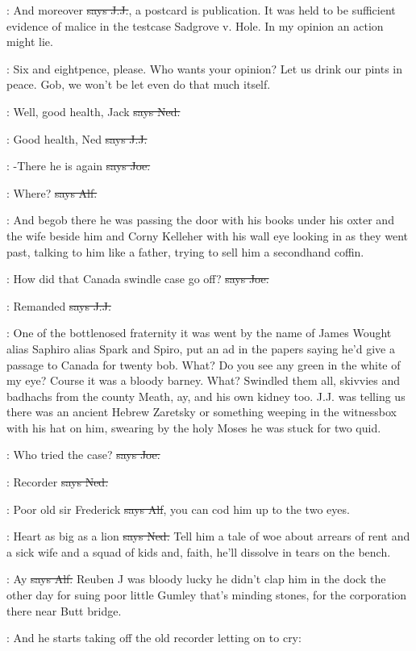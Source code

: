 \jjom:
And moreover
\sout{says J.J.},
a postcard is publication.
It was held to be
sufficient evidence of malice in the testcase Sadgrove v.
Hole.
In my
opinion an action might lie.

\Nq:
Six and eightpence,
please.
Who wants your opinion?
Let us drink
our pints in peace.
Gob,
we won't be let even do that much itself.

\lambert:
Well,
good health,
Jack
\sout{says Ned.}

\jjom:
Good health,
Ned
\sout{says J.J.}

\joe:
-There he is again
\sout{says Joe.}

\bergan:
Where?
\sout{says Alf.}

\Nq:
And begob there he was
passing the door with his books under his
oxter and the wife beside him and Corny Kelleher with his wall eye looking
in as they went past,
talking to him like a father,
trying to sell him a
secondhand coffin.

\joe:
How did that Canada swindle case go off?
\sout{says Joe.}

\jjom:
Remanded
\sout{says J.J.}

\Nq:
One of the bottlenosed fraternity it was went by the name of James
Wought alias Saphiro alias Spark and Spiro,
put an ad in the papers saying
he'd give a passage to Canada for twenty bob.
What?
Do you see any green
in the white of my eye?
Course it was a bloody barney.
What?
Swindled
them all,
skivvies and badhachs from the county Meath,
ay,
and his own
kidney too.
J.J.
was telling us there was an ancient Hebrew Zaretsky or
something weeping in the witnessbox with his hat on him,
swearing by the
holy Moses he was stuck for two quid.

\joe:
Who tried the case?
\sout{says Joe.}

\lambert:
Recorder
\sout{says Ned.}

\bergan:
Poor old sir Frederick
\sout{says Alf},
you can cod him up to the two eyes.

\lambert:
Heart as big as a lion
\sout{says Ned.}
Tell him a tale of woe about arrears
of rent and a sick wife and a squad of kids and,
faith,
he'll dissolve in
tears on the bench.

\bergan:
Ay
\sout{says Alf.}
Reuben J was bloody lucky he didn't clap him in the dock
the other day for suing poor little Gumley that's minding stones,
for the
corporation there near Butt bridge.

\Nq:
And he starts taking off the old recorder letting on to cry:

